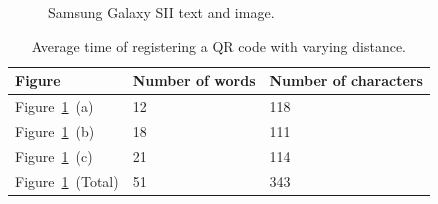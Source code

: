 	\begin{figure}[H]%
		\centering
   		 \qquad
   		 \qquad
   		 \qquad
		\caption{Samsung Galaxy SII text and image.}
		\label{glassTestTextLengthS2Columns}
	\end{figure}

	\begin{table}[ht!]
    		\caption{Average time of registering a QR code with varying distance.} \label{tab:glassTestTextLengthS2ColumnsTable}
		\centering \begin{tabularx}{\textwidth}{l|X|X} \hline
		\textbf{Figure} & \textbf{Number of words} & \textbf{Number of characters} \\ \hline \hline
       
		Figure~\ref{glassTestTextLengthS2Columns}~(a)	&12	&118	\\ \hline
		Figure~\ref{glassTestTextLengthS2Columns}~(b)	&18	&111	\\ \hline
		Figure~\ref{glassTestTextLengthS2Columns}~(c)	&21	&114	\\ \hline
		Figure~\ref{glassTestTextLengthS2Columns}~(Total)	&51	&343	\\ \hline
		
		\end{tabularx}
	\end{table}

